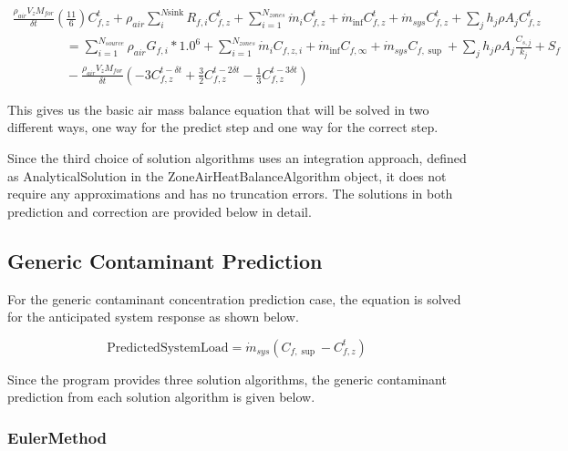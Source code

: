 \begin{equation}
\begin{array}{l}\frac{{{\rho_{air}}{V_z}{M_{for}}}}{{\delta t}}\left( {\frac{{11}}{6}} \right)C_{f,z}^t + {\rho_{air}}\sum\limits_i^{N{\mathrm{sink}}} {{R_{f,i}}C_{f,z}^t}  + \sum\limits_{i = 1}^{{N_{zones}}} {{{\dot m}_i}} C_{f,z}^t + {{\dot m}_{\inf }}C_{f,z}^t + {{\dot m}_{sys}}C_{f,z}^t + \sum\limits_j {{h_j}\rho {A_j}C_{f,z}^t} \\\;\;\;\;\;\;\;\;\;\;\;\;\;\;\; = \sum\limits_{i = 1}^{{N_{source}}} {{\rho_{air}}{G_{f,i}}*{{1.0}^6}}  + \sum\limits_{i = 1}^{{N_{zones}}} {{{\dot m}_i}} {C_{f,z,i}} + {{\dot m}_{\inf }}{C_{f,\infty }} + {{\dot m}_{sys}}{C_{f,\sup }} + \sum\limits_j {{h_j}\rho {A_j}\frac{{{C_{s,j}}}}{{{k_j}}}}  + {S_f}\\\;\;\;\;\;\;\;\;\;\;\;\;\;\;\; - \frac{{{\rho_{air}}{V_z}{M_{for}}}}{{\delta t}}\left( { - 3C_{f,z}^{t - \delta t} + \frac{3}{2}C_{f,z}^{t - 2\delta t} - \frac{1}{3}C_{f,z}^{t - 3\delta t}} \right)\end{array}
\end{equation}

This gives us the basic air mass balance equation that will be solved in two different ways, one way for the predict step and one way for the correct step.

Since the third choice of solution algorithms uses an integration approach, defined as AnalyticalSolution in the ZoneAirHeatBalanceAlgorithm object, it does not require any approximations and has no truncation errors. The solutions in both prediction and correction are provided below in detail.

\subsection{Generic Contaminant Prediction}\label{generic-contaminant-prediction}

For the generic contaminant concentration prediction case, the equation is solved for the anticipated system response as shown below.

\begin{equation}
{\mathrm{PredictedSystemLoad}} = {\dot m_{sys}}\left( {{C_{f,\sup }} - C_{f,z}^t} \right)
\end{equation}

Since the program provides three solution algorithms, the generic contaminant prediction from each solution algorithm is given below.

\subsubsection{EulerMethod}\label{eulermethod-000}

